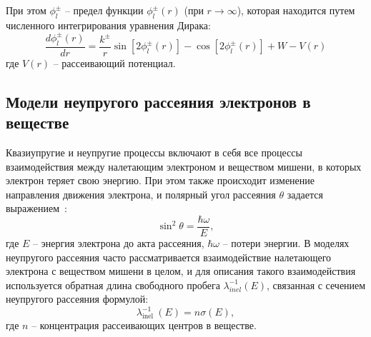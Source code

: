 При этом $\phi_l^\pm$ -- предел функции $\phi_l^\pm (r)$ (при $r \rightarrow \infty$), которая находится путем численного интегрирования уравнения Дирака:
\begin{equation}
	\frac{d \phi_l^{\pm}(r)}{d r}=\frac{k^{\pm}}{r} \sin \left[2 \phi_l^{\pm}(r)\right]-\cos \left[2 \phi_l^{\pm}(r)\right]+W-V(r)
\end{equation}
где $V(r)$ -- рассеивающий потенциал.


\subsection{Модели неупругого рассеяния электронов в веществе}
Квазиупругие и неупругие процессы включают в себя все процессы взаимодействия между налетающим электроном и веществом мишени, в которых электрон теряет свою энергию. При этом также происходит изменение направления движения электрона, и полярный угол рассеяния $\theta$ задается выражением~\cite{Ciappa_2010}:
\begin{equation}
	\sin ^2 \theta=\frac{\hbar \omega}{E},
\end{equation}
где $E$ -- энергия электрона до акта рассеяния, $\hbar \omega$ -- потери энергии. В моделях неупругого рассеяния часто рассматривается взаимодействие налетающего электрона с веществом мишени в целом, и для описания такого взаимодействия используется обратная длина свободного пробега $\lambda_{inel}^{-1}(E)$, связанная с сечением неупругого рассеяния формулой:
\begin{equation}
	\lambda_{\text {inel }}^{-1}(E)=n \sigma(E),
\end{equation}
где $n$ -- концентрация рассеивающих центров в веществе.


